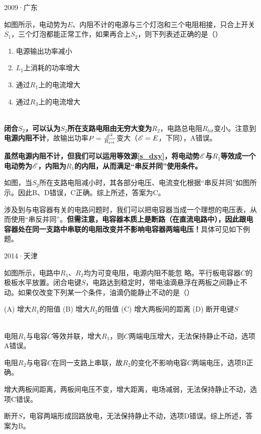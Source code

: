 \begin{ep}{2009·广东}{}



如图所示，电动势为$E$、内阻不计的电源与三个灯泡和三个电阻相接，只合上开关$S_1$，三个灯泡都能正常工作，如果再合上$S_2$，则下列表述正确的是（）

\begin{enumerate}[label=(\Alph*)]
  \item 电源输出功率减小
  \item $L_1$上消耗的功率增大
  \item 通过$R_1$上的电流增大
  \item 通过$R_3$上的电流增大
\end{enumerate}

~\\
\textbf{闭合$S_2$，可以认为$S_2$所在支路电阻由无穷大变为$R_2$}，电路总电阻$R_{tot}$变小。注意到\textbf{电源内阻不计}，故输出功率$P=\frac{\mathscr{E}^2}{R_{tot}}$变大（$\mathscr{E} = E$，下同），A错误。

\textbf{虽然电源内阻不计，但我们可以运用等效源\eqref{s_dxy}，将电动势$\mathscr{E}$与$R_1$等效成一个电动势为$\mathscr{E}$，内阻为$R_1$的内阻，从而满足“串反并同”使用条件。}



如图，当$S_2$所在支路电阻减小时，其各部分电压、电流变化根据“串反并同”如图所示。因此B、D错误，C正确。综上所述，答案为C。

\end{ep}

涉及到与电容器有关的电路问题时，我们可以把电容器当成一个理想的电压表，从而使用“串反并同”。\textbf{但需注意，电容器本质上是断路（在直流电路中），因此跟电容器处在同一支路中串联的电阻改变并不影响电容器两端电压！}具体可见如下例题。

\begin{ep}{2014·天津}{}



如图所示，电路中$R_1$、$R_2$均为可变电阻，电源内阻不能忽
略。平行板电容器$C$的极板水平放置。闭合电键$S$，电路达到稳定时，带电油滴悬浮在两板之间静止不动。如果仅改变下列某一个条件，油滴仍能静止不动的是（）

(A) 增大$R_1$的阻值 \quad (B) 增大$R_2$的阻值 \quad (C) 增大两板间的距离 \quad (D) 断开电键$S$

~\\
电阻$R_1$与电容$C$等效并联，增大$R_1$，则$C$两端电压增大，无法保持静止不动，选项A错误。

电阻$R_2$与电容$C$在同一支路上串联，故$R_2$的变化不影响电容$C$两端电压，选项B正确。

增大两板间距离，两板间电压不变，增大距离，电场减弱，无法保持静止不动，选项C错误。

断开$S$，电容两端形成回路放电，无法保持静止不动，选项D错误。综上所述，答案为B。
\end{ep}

